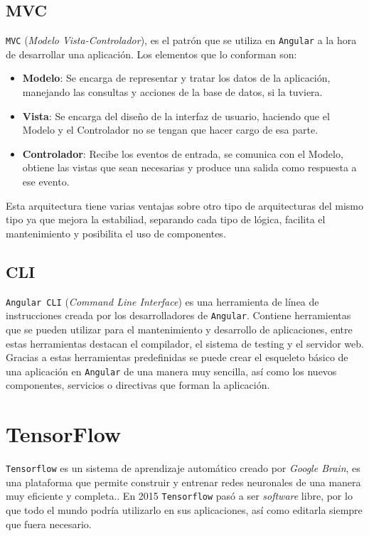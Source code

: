 \documentclass[a4paper, 12pt]{book}
\begin{document}
\subsection{MVC}
\label{subsec:mvc}

\texttt{MVC} (\textit{Modelo Vista-Controlador})\cite{mvc}, es el patrón que se utiliza en \texttt{Angular} a la hora de desarrollar una aplicación. Los elementos que lo conforman son:

\begin{itemize}
	\item \textbf{Modelo}: Se encarga de representar y tratar los datos de la aplicación, manejando las consultas y acciones de la base de datos, si la tuviera. 
	\item \textbf{Vista}: Se encarga del diseño de la interfaz de usuario, haciendo que el Modelo y el Controlador no se tengan que hacer cargo de esa parte.
	\item \textbf{Controlador}: Recibe los eventos de entrada, se comunica con el Modelo, obtiene las vistas que sean necesarias y produce una salida como respuesta a ese evento.
\end{itemize}

Esta arquitectura tiene varias ventajas sobre otro tipo de arquitecturas del mismo tipo ya que mejora la estabiliad, separando cada tipo de lógica, facilita el mantenimiento y posibilita el uso de componentes.

\subsection{CLI}
\label{subsec:cli}

\texttt{Angular CLI} (\textit{Command Line Interface})\cite{angularcli} es una herramienta de línea de instrucciones creada por los desarrolladores de \texttt{Angular}. Contiene herramientas que se pueden utilizar para el mantenimiento y desarrollo de aplicaciones, entre estas herramientas destacan el compilador, el sistema de testing y el servidor web. Gracias a estas herramientas predefinidas se puede crear el esqueleto básico de una aplicación en \texttt{Angular} de una manera muy sencilla, así como los nuevos componentes, servicios o directivas que forman la aplicación.

\section{TensorFlow}
\label{sec:tensorflow}

\texttt{Tensorflow}\cite{tensorflow} es un sistema de aprendizaje automático creado por \textit{Google Brain}, es una plataforma que permite construir y entrenar redes neuronales de una manera muy eficiente y completa.. En 2015 \texttt{Tensorflow} pasó a ser \textit{software} libre, por lo que todo el mundo podría utilizarlo en sus aplicaciones, así como editarla siempre que fuera necesario.
\end{document}
